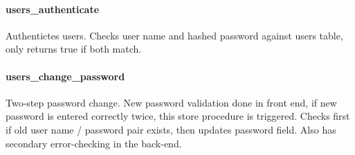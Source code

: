 \paragraph{users\_authenticate}\label{usersux5fauthenticate}

Authentictes users. Checks user name and hashed password against users
table, only returns true if both match.

\begin{Shaded}
\begin{Highlighting}[]
  \NormalTok{(}\NormalTok{), }  \NormalTok{(}\NormalTok{))}
        \NormalTok{;}
\end{Highlighting}
\end{Shaded}

\paragraph{users\_change\_password}\label{usersux5fchangeux5fpassword}

Two-step password change. New password validation done in front end, if
new password is entered correctly twice, this store procedure is
triggered. Checks first if old user name / password pair exists, then
updates password field. Also has secondary error-checking in the
back-end.

\begin{Shaded}
\begin{Highlighting}[]
  \NormalTok{(}\NormalTok{), } \NormalTok{(}\NormalTok{), } \NormalTok{(}\NormalTok{))}
         
     
           
         \NormalTok{;}
     \NormalTok{;}
\end{Highlighting}
\end{Shaded}

